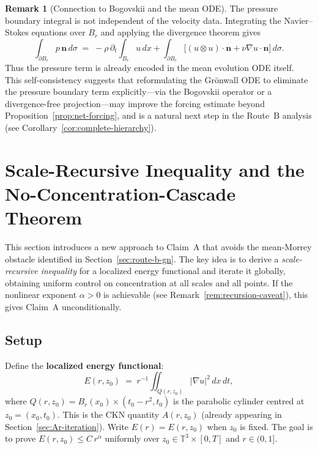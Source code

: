 \documentclass[11pt]{article}
\theoremstyle{definition}
\newtheorem{remark}[theorem]{Remark}
\theoremstyle{remark}
\newcommand{\T}{\mathbb{T}}
\begin{document}
\begin{remark}[Connection to Bogovskii and the mean ODE]
\label{rem:bogovskii}
  The pressure boundary integral is not independent of the velocity data.
  Integrating the Navier--Stokes equations over $B_r$ and applying the divergence
  theorem gives
  \[
    \int_{\partial B_r} p\,\mathbf{n}\,d\sigma
    \;=\; -\rho\,\partial_t\!\int_{B_r} u\,dx
          + \int_{\partial B_r}\bigl[(u\otimes u)\cdot\mathbf{n}
            + \nu\nabla u\cdot\mathbf{n}\bigr]\,d\sigma.
  \]
  Thus the pressure term is already encoded in the mean evolution ODE itself.
  This self-consistency suggests that reformulating the Gr\"{o}nwall ODE to
  eliminate the pressure boundary term explicitly---via the Bogovskii operator
  or a divergence-free projection---may improve the forcing estimate beyond
  Proposition~\ref{prop:net-forcing}, and is a natural next step in the
  Route~B analysis (see Corollary~\ref{cor:complete-hierarchy}).
\end{remark}

\section{Scale-Recursive Inequality and the No-Concentration-Cascade Theorem}
\label{sec:scale-recursive}

This section introduces a new approach to Claim~A that avoids the mean-Morrey
obstacle identified in Section~\ref{sec:route-b-gn}.  The key idea is to derive
a \emph{scale-recursive inequality} for a localized energy functional and iterate
it globally, obtaining uniform control on concentration at all scales and all
points.  If the nonlinear exponent $\alpha>0$ is achievable (see
Remark~\ref{rem:recursion-caveat}), this gives Claim~A unconditionally.

\subsection*{Setup}

Define the \textbf{localized energy functional}:
\begin{equation}\label{eq:local-energy-def}
  E(r,z_0) \;=\; r^{-1}\iint_{Q(r,z_0)} |\nabla u|^2\,dx\,dt,
\end{equation}
where $Q(r,z_0) = B_r(x_0)\times(t_0-r^2,t_0)$ is the parabolic cylinder
centred at $z_0=(x_0,t_0)$.  This is the CKN quantity $A(r,z_0)$ (already
appearing in Section~\ref{sec:Ar-iteration}).  Write $E(r) = E(r,z_0)$ when
$z_0$ is fixed.  The goal is to prove $E(r,z_0)\leq C\,r^\alpha$ uniformly
over $z_0\in\T^3\times[0,T]$ and $r\in(0,1]$.
\end{document}
